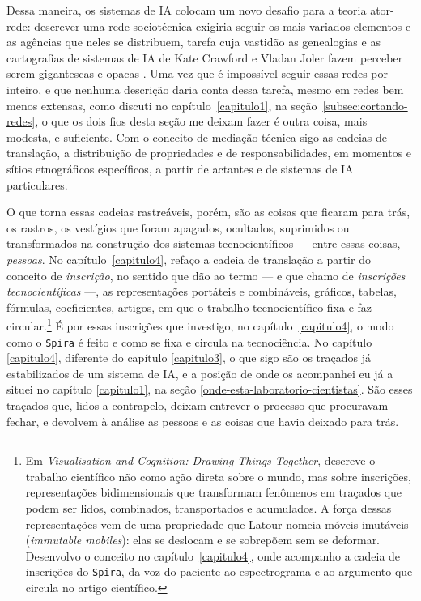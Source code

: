 Dessa maneira, os sistemas de IA colocam um novo desafio para a teoria ator-rede: descrever uma rede sociotécnica exigiria seguir os mais variados elementos e as agências que neles se distribuem, tarefa cuja vastidão as genealogias e as cartografias de sistemas de IA de Kate Crawford e Vladan Joler fazem perceber serem gigantescas e opacas \parencite{Crawford2018Anatomy}. Uma vez que é impossível seguir essas redes por inteiro, e que nenhuma descrição daria conta dessa tarefa, mesmo em redes bem menos extensas, como discuti no capítulo~\ref{capitulo1}, na seção~\ref{subsec:cortando-redes}, o que os dois fios desta seção me deixam fazer é outra coisa, mais modesta, e suficiente. Com o conceito de mediação técnica sigo as cadeias de translação, a distribuição de propriedades e de responsabilidades, em momentos e sítios etnográficos específicos, a partir de actantes e de sistemas de IA particulares.

O que torna essas cadeias rastreáveis, porém, são as coisas que ficaram para trás, os rastros, os vestígios que foram apagados, ocultados, suprimidos ou transformados na construção dos sistemas tecnocientíficos --- entre essas coisas, \textit{pessoas}. No capítulo~\ref{capitulo4}, refaço a cadeia de translação a partir do conceito de \textit{inscrição}, no sentido que \textcite{Latour1986Visualization, Latour2011CienciaEmAcao, Latour1986Writing} dão ao termo --- e que chamo de \textit{inscrições tecnocientíficas} ---, as representações portáteis e combináveis, gráficos, tabelas, fórmulas, coeficientes, artigos, em que o trabalho tecnocientífico fixa e faz circular.\footnote{Em \textit{Visualisation and Cognition: Drawing Things Together}, \textcite{Latour1986Visualization} descreve o trabalho científico não como ação direta sobre o mundo, mas sobre inscrições, representações bidimensionais que transformam fenômenos em traçados que podem ser lidos, combinados, transportados e acumulados. A força dessas representações vem de uma propriedade que Latour nomeia móveis imutáveis (\emph{immutable mobiles}): elas se deslocam e se sobrepõem sem se deformar. Desenvolvo o conceito no capítulo~\ref{capitulo4}, onde acompanho a cadeia de inscrições do \texttt{Spira}, da voz do paciente ao espectrograma e ao argumento que circula no artigo científico.} É por essas inscrições que investigo, no capítulo~\ref{capitulo4}, o modo como o \texttt{Spira} é feito e como se fixa e circula na tecnociência. No capítulo \ref{capitulo4}, diferente do capítulo \ref{capitulo3}, o que sigo são os traçados já estabilizados de um sistema de IA, e a posição de onde os acompanhei eu já a situei no capítulo \ref{capitulo1}, na seção \ref{onde-esta-laboratorio-cientistas}. São esses traçados que, lidos a contrapelo, deixam entrever o processo que procuravam fechar, e devolvem à análise as pessoas e as coisas que havia deixado para trás.

